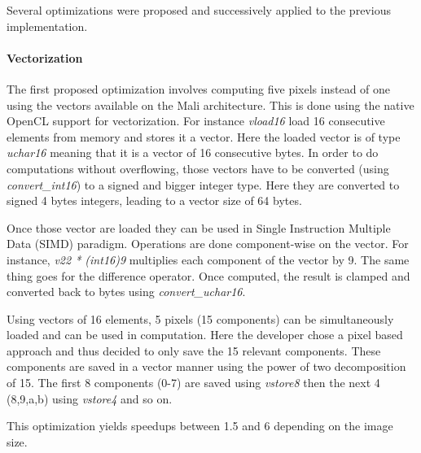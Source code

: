 \documentclass{IEEEtran}
\begin{document}
Several optimizations were proposed and successively applied to the previous
implementation.

\paragraph{Vectorization} The first proposed optimization involves computing
five pixels instead of one using the vectors available on the Mali
architecture. This is done using the native OpenCL support for vectorization.
For instance \emph{vload16} load 16 consecutive elements from memory and stores
it a vector.  Here the loaded vector is of type \emph{uchar16} meaning that it
is a vector of 16 consecutive bytes. In order to do computations without
overflowing, those vectors have to be converted (using \emph{convert\_int16}) to
a signed and bigger integer type.  Here they are converted to signed 4 bytes
integers, leading to a vector size of 64 bytes.

Once those vector are loaded they can be used in Single Instruction Multiple
Data (SIMD) paradigm. Operations are done component-wise on the vector. For
instance, \emph{v22 * (int16)9} multiplies each component of the vector by 9.
The same thing goes for the difference operator. Once computed, the result is
clamped and converted back to bytes using \emph{convert\_uchar16}.

Using vectors of 16 elements, 5 pixels (15 components) can be simultaneously
loaded and can be used in computation. Here the developer chose a pixel based
approach and thus decided to only save the 15 relevant components. These
components are saved in a vector manner using the power of two decomposition
of 15. The first 8 components (0-7) are saved using \emph{vstore8} then the
next 4 (8,9,a,b) using \emph{vstore4} and so on.

This optimization yields speedups between 1.5 and 6 depending on the image size.
\end{document}
